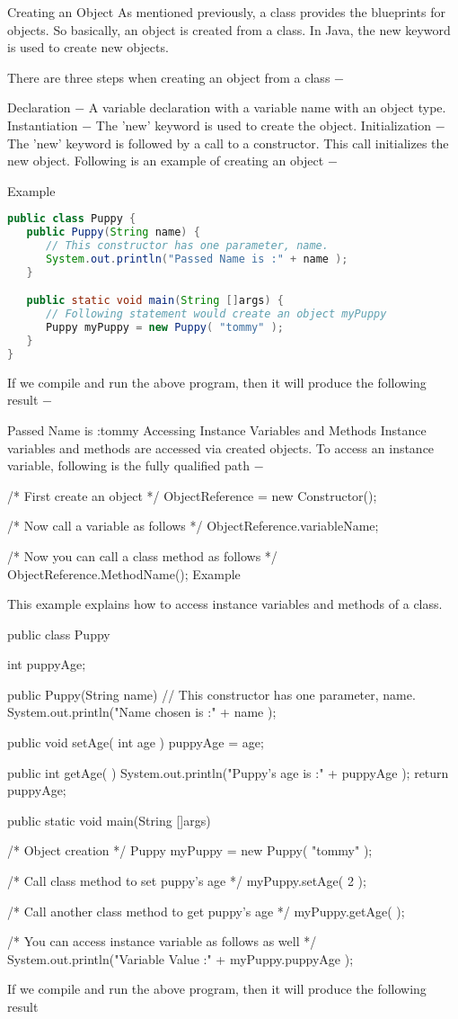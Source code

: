 Creating an Object
As mentioned previously, a class provides the blueprints for objects. So basically, an object is created from a class. In Java, the new keyword is used to create new objects.

There are three steps when creating an object from a class −

Declaration − A variable declaration with a variable name with an object type.
Instantiation − The 'new' keyword is used to create the object.
Initialization − The 'new' keyword is followed by a call to a constructor. This call initializes the new object.
Following is an example of creating an object −

Example

\begin{lstlisting}[language=Java]
public class Puppy {
   public Puppy(String name) {
      // This constructor has one parameter, name.
      System.out.println("Passed Name is :" + name );
   }

   public static void main(String []args) {
      // Following statement would create an object myPuppy
      Puppy myPuppy = new Puppy( "tommy" );
   }
}
\end{lstlisting}

If we compile and run the above program, then it will produce the following result −

Passed Name is :tommy
Accessing Instance Variables and Methods
Instance variables and methods are accessed via created objects. To access an instance variable, following is the fully qualified path −

/* First create an object */
ObjectReference = new Constructor();

/* Now call a variable as follows */
ObjectReference.variableName;

/* Now you can call a class method as follows */
ObjectReference.MethodName();
Example

This example explains how to access instance variables and methods of a class.

public class Puppy {
   int puppyAge;

   public Puppy(String name) {
      // This constructor has one parameter, name.
      System.out.println("Name chosen is :" + name );
   }

   public void setAge( int age ) {
      puppyAge = age;
   }

   public int getAge( ) {
      System.out.println("Puppy's age is :" + puppyAge );
      return puppyAge;
   }

   public static void main(String []args) {
      /* Object creation */
      Puppy myPuppy = new Puppy( "tommy" );

      /* Call class method to set puppy's age */
      myPuppy.setAge( 2 );

      /* Call another class method to get puppy's age */
      myPuppy.getAge( );

      /* You can access instance variable as follows as well */
      System.out.println("Variable Value :" + myPuppy.puppyAge );
   }
}
If we compile and run the above program, then it will produce the following result

